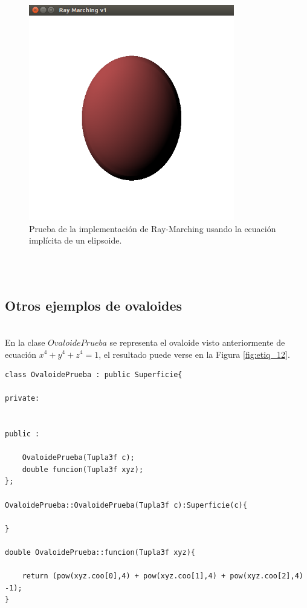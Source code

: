 \begin{figure}[h]
	\begin{center}
		\includegraphics[width=0.8\textwidth]{imagenes/Prueba2.png}
	\end{center}
	\caption{Prueba de la implementación de Ray-Marching usando la ecuación implícita de un elipsoide.}
	\label{fig:etiq_10}
\end{figure}
${ }$\\

${ }$\\
\subsection{Otros ejemplos de ovaloides}
${ }$\\

En la clase $OvaloidePrueba$ se representa el ovaloide visto anteriormente de ecuación $x^4 + y^4 + z^4 = 1$, el resultado puede verse en la Figura \ref{fig:etiq_12}.
${ }$\\

\begin{lstlisting}[style=Consola]
class OvaloidePrueba : public Superficie{

private:


public :

	OvaloidePrueba(Tupla3f c);
	double funcion(Tupla3f xyz);
};

OvaloidePrueba::OvaloidePrueba(Tupla3f c):Superficie(c){

}

double OvaloidePrueba::funcion(Tupla3f xyz){

	return (pow(xyz.coo[0],4) + pow(xyz.coo[1],4) + pow(xyz.coo[2],4) -1);
}
\end{lstlisting}
${ }$\\


